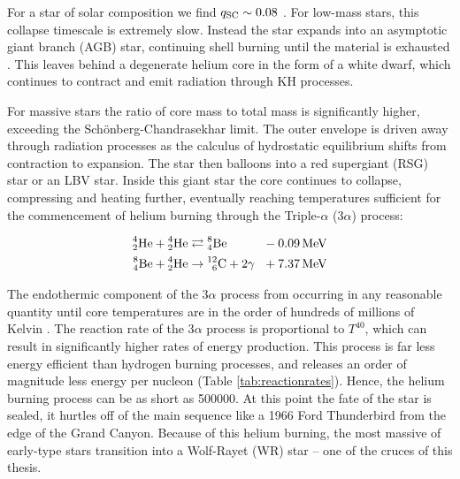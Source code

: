 \noindent
For a star of solar composition we find $q\rms{SC} \sim 0.08$
\parencite[Ch.~5]{salarisEvolutionStarsStellar2005}.
For low-mass stars, this collapse timescale is extremely slow.
Instead the star expands into an asymptotic giant branch (AGB) star, continuing shell burning until the material is exhausted
\parencite{beechSchoenbergChandrasekharLimitPolytropic1988}.
This leaves behind a degenerate helium core in the form of a white dwarf, which continues to contract and emit radiation through KH processes.

For massive stars the ratio of core mass to total mass is significantly higher, exceeding the Sch{\"o}nberg-Chandrasekhar limit.
The outer envelope is driven away through radiation processes as the calculus of hydrostatic equilibrium shifts from contraction to expansion.
The star then balloons into a red supergiant (RSG) star or an LBV star.
Inside this giant star the core continues to collapse, compressing and heating further, eventually reaching temperatures sufficient for the commencement of helium burning through the Triple-$\alpha$ (3$\alpha$) process:

\begin{equation}
  \begin{alignedat}{3}
    \atom{He}{4}{2} + \atom{He}{4}{2} & \rightleftarrows \atom{Be}{8}{4} && ~~ - \SI{0.09}{\mega\electronvolt} \\
    \atom{Be}{8}{4} + \atom{He}{4}{2} & \rightarrow \atom{C}{12}{6} + 2\gamma && ~~ + \SI{7.37}{\mega\electronvolt} 
  \end{alignedat}
\end{equation}

\noindent
The endothermic component of the 3$\alpha$ process  from occurring in any reasonable quantity until core temperatures are in the order of hundreds of millions of Kelvin
.
The reaction rate of the 3$\alpha$ process is proportional to $T^{40}$, which can result in significantly higher rates of energy production.
This process is far less energy efficient than hydrogen burning processes, and releases an order of magnitude less energy per nucleon (Table \ref{tab:reactionrates}).
Hence, the helium burning process can be as short as \SI{500000}{\year}.
At this point the fate of the star is sealed, it hurtles off of the main sequence like a 1966 Ford Thunderbird from the edge of the Grand Canyon.
Because of this helium burning, the most massive of early-type stars transition into a Wolf-Rayet (WR) star -- one of the cruces of this thesis.

